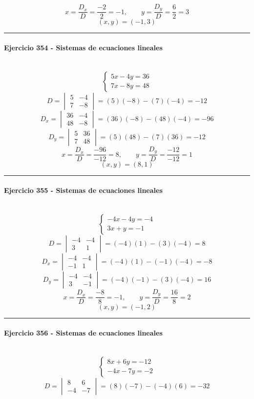 \documentclass[10pt,a4paper]{article}
\newcommand{\res}[1]{\paragraph{#1}\mbox{}\\[-1.2em]}
\begin{document}
\[ x=\frac{D_x}{D}=\frac{-2}{2}=-1,\qquad y=\frac{D_y}{D}=\frac{6}{2}=3 \]
\[ \boxed{(x,y)=(-1,3)} \]
\vspace{1mm}\hrule\vspace{2mm}
\res{Ejercicio 354 - Sistemas de ecuaciones lineales}
\[ \begin{cases}5 x - 4 y=36\\7 x - 8 y=48\end{cases} \]
\[ D=\begin{vmatrix}5&-4\\7&-8\end{vmatrix}=(5)(-8)-(7)(-4)=-12 \]
\[ D_x=\begin{vmatrix}36&-4\\48&-8\end{vmatrix}=(36)(-8)-(48)(-4)=-96 \]
\[ D_y=\begin{vmatrix}5&36\\7&48\end{vmatrix}=(5)(48)-(7)(36)=-12 \]
\[ x=\frac{D_x}{D}=\frac{-96}{-12}=8,\qquad y=\frac{D_y}{D}=\frac{-12}{-12}=1 \]
\[ \boxed{(x,y)=(8,1)} \]
\vspace{1mm}\hrule\vspace{2mm}
\res{Ejercicio 355 - Sistemas de ecuaciones lineales}
\[ \begin{cases}- 4 x - 4 y=-4\\3 x + y=-1\end{cases} \]
\[ D=\begin{vmatrix}-4&-4\\3&1\end{vmatrix}=(-4)(1)-(3)(-4)=8 \]
\[ D_x=\begin{vmatrix}-4&-4\\-1&1\end{vmatrix}=(-4)(1)-(-1)(-4)=-8 \]
\[ D_y=\begin{vmatrix}-4&-4\\3&-1\end{vmatrix}=(-4)(-1)-(3)(-4)=16 \]
\[ x=\frac{D_x}{D}=\frac{-8}{8}=-1,\qquad y=\frac{D_y}{D}=\frac{16}{8}=2 \]
\[ \boxed{(x,y)=(-1,2)} \]
\vspace{1mm}\hrule\vspace{2mm}
\res{Ejercicio 356 - Sistemas de ecuaciones lineales}
\[ \begin{cases}8 x + 6 y=-12\\- 4 x - 7 y=-2\end{cases} \]
\[ D=\begin{vmatrix}8&6\\-4&-7\end{vmatrix}=(8)(-7)-(-4)(6)=-32 \]
\end{document}
